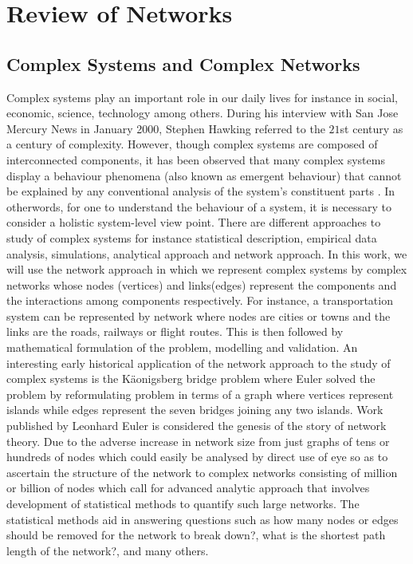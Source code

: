 \documentclass[10pt,a4paper]{article}
\begin{document}
	\newpage
	\section{Review of Networks}
	\subsection{Complex Systems and Complex Networks}
	Complex systems play an important role in our daily lives for instance in social, economic, science, technology among others.  During his interview with San Jose Mercury News in January 2000, Stephen Hawking referred to the $21$st century as a century of complexity. However, though complex systems are composed of interconnected components, it has been observed that many complex systems display a behaviour phenomena (also known as emergent behaviour) that cannot be explained by any conventional analysis of the system's constituent parts \citep{EncyBrit}. In otherwords, for one to understand the behaviour of a system, it is necessary to consider a holistic system-level view point.  There are different approaches to study of complex systems for instance statistical description, empirical data analysis, simulations, analytical approach and network approach. In this work, we will use the network approach in which we represent complex systems by complex networks whose nodes (vertices) and links(edges) represent the components and the interactions among components respectively.  For instance, a transportation system can be represented by network where nodes are cities or towns and the links are the roads, railways or flight routes. This is then followed by mathematical formulation of the problem, modelling and validation.  
	An interesting early historical application of the network approach to the study of complex systems is the K\"{a}onigsberg bridge problem where Euler \citep{euler1976solution;euler1953leonhard} solved the problem by reformulating problem in terms of a graph where vertices represent islands while edges represent the seven bridges joining any two islands. Work published by Leonhard Euler \citep{euler1976solution} is considered the genesis of the story of network theory.
	Due to the adverse increase in network size from just graphs of tens or hundreds of nodes which could easily be analysed by direct use of eye so as to ascertain the structure of the network  to complex networks consisting of million or billion of nodes which call for advanced analytic approach that involves development of statistical methods to quantify such large networks. The statistical methods aid in answering questions such as how many nodes or edges should be removed for the network to break down?, what is the shortest path length of the network?, and many others. 
	
\end{document}

